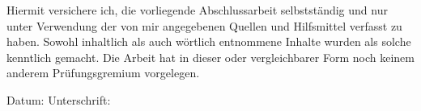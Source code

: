\label{erklaerung}

Hiermit versichere ich, die vorliegende Abschlussarbeit selbstständig und nur unter Verwendung der von mir angegebenen Quellen und Hilfsmittel verfasst zu haben. Sowohl inhaltlich als auch wörtlich entnommene Inhalte wurden als solche kenntlich gemacht. Die Arbeit hat in dieser oder vergleichbarer Form noch keinem anderem Prüfungsgremium vorgelegen.\bigskip
\bigskip
\bigskip

Datum:	\hrulefill\enspace Unterschrift: \hrulefill

\newpage
{}
\label{danksagungen}


